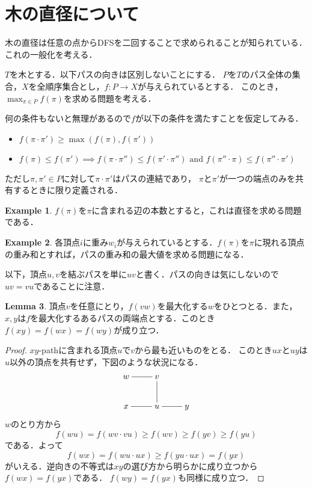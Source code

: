 \documentclass{scrartcl}
\theoremstyle{definition}
\newtheorem{lemma}{Lemma}
\newtheorem{example}[lemma]{Example}
\begin{document}
\section{木の直径について}

木の直径は任意の点からDFSを二回することで求められることが知られている．これの一般化を考える．

$T$を木とする．以下パスの向きは区別しないことにする．
$P$を$T$のパス全体の集合，$X$を全順序集合とし，$f: P \to X$が与えられているとする．
このとき，$\max_{\pi \in P} f(\pi)$を求める問題を考える．

何の条件もないと無理があるので$f$が以下の条件を満たすことを仮定してみる．
\begin{itemize}
\item $f(\pi \cdot \pi') \ge \max(f(\pi), f(\pi'))$
\item $f(\pi) \le f(\pi') \implies f(\pi \cdot \pi'') \le f(\pi' \cdot \pi'')
  \text{ and } f(\pi'' \cdot \pi) \le f(\pi'' \cdot \pi')$
\end{itemize}
ただし$\pi, \pi' \in P$に対して$\pi \cdot \pi'$はパスの連結であり，
$\pi$と$\pi'$が一つの端点のみを共有するときに限り定義される．

\begin{example}
  $f(\pi)$を$\pi$に含まれる辺の本数とすると，これは直径を求める問題である．
\end{example}

\begin{example}
  各頂点$i$に重み$w_i$が与えられているとする．$f(\pi)$を$\pi$に現れる頂点の重み和とすれば，パスの重み和の最大値を求める問題になる．
\end{example}

以下，頂点$u, v$を結ぶパスを単に$uv$と書く．パスの向きは気にしないので$uv=vu$であることに注意．

\begin{lemma}
  頂点$v$を任意にとり，$f(vw)$を最大化する$w$をひとつとる．また，$x, y$は$f$を最大化するあるパスの両端点とする．このとき$f(xy) = f(wx) = f(wy)$が成り立つ．
\end{lemma}
\begin{proof}
  $xy$-pathに含まれる頂点$u$で$v$から最も近いものをとる．
  このとき$ux$と$uy$は$u$以外の頂点を共有せず，下図のような状況になる．
  \begin{displaymath}
    \xymatrix{
      w \ar@{-}[r]& v \\
      x \ar@{-}[r]& u \ar@{-}[u] \ar@{-}[r] & y
    }
  \end{displaymath}
  $w$のとり方から
  \begin{displaymath}
    f(wu) = f(wv \cdot vu) \ge f(wv) \ge f(yv) \ge f(yu)
  \end{displaymath}
  である．よって
  \begin{displaymath}
    f(wx) = f(wu \cdot ux) \ge f(yu \cdot ux) = f(yx)
  \end{displaymath}
  がいえる．逆向きの不等式は$xy$の選び方から明らかに成り立つから$f(wx) = f(yx)$である．
  $f(wy) = f(yx)$も同様に成り立つ．
\end{proof}
\end{document}
